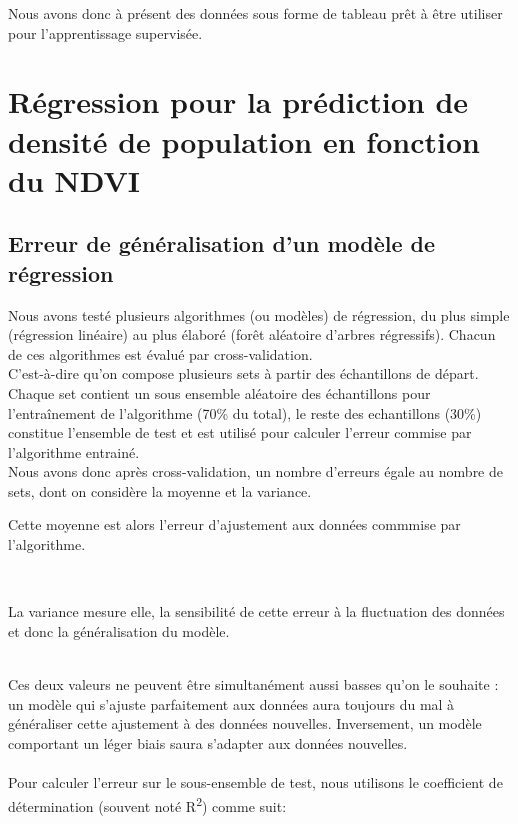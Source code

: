 \documentclass{book}
\begin{document}
\clearpage

Nous avons donc à présent des données sous forme de tableau prêt à être utiliser pour l'apprentissage supervisée.

\chapter{Régression pour la prédiction de densité de population en fonction du NDVI}

\section{Erreur de généralisation d'un modèle de régression}

Nous avons testé plusieurs algorithmes (ou modèles) de régression, du plus simple (régression linéaire) au plus élaboré (forêt aléatoire d'arbres régressifs).
Chacun de ces algorithmes est évalué par cross-validation. \\
C'est-à-dire qu'on compose plusieurs sets à partir des échantillons de départ. Chaque set contient un sous ensemble
aléatoire des échantillons pour l'entraînement de l'algorithme (70\% du total), le reste des echantillons (30\%) constitue l'ensemble de test
et est utilisé pour calculer l'erreur commise par l'algorithme entrainé.\\
Nous avons donc après cross-validation, un nombre d'erreurs égale au nombre de sets, dont on considère la moyenne et la variance.\\
\begin{bf}Cette moyenne est alors l'erreur d'ajustement aux données commmise par l'algorithme.\end{bf}\\
\begin{bf}La variance mesure elle, la sensibilité de cette erreur à la fluctuation des données et donc la généralisation du modèle.\end{bf}\\
Ces deux valeurs ne peuvent être simultanément aussi basses qu'on le souhaite : un modèle qui s'ajuste parfaitement aux données aura toujours du
mal à généraliser cette ajustement à des données nouvelles. Inversement, un modèle comportant un léger biais saura s'adapter aux données nouvelles.\\
\\
Pour calculer l'erreur sur le sous-ensemble de test, nous utilisons le coefficient de détermination (souvent noté R\textsuperscript{2}) comme suit:
\end{document}
